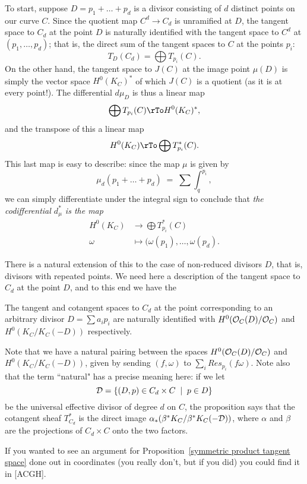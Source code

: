To start, suppose $D = p_1 + \dots + p_d$ is a divisor consisting of $d$ distinct points on our curve $C$. Since the quotient map $C^d \to C_d$ is unramified at $D$, the tangent space to $C_d$ at the point $D$ is naturally identified with the tangent space to $C^d$ at $(p_1,\dots,p_d)$; that is, the direct sum of the tangent spaces to $C$ at the points $p_i$:
$$
T_D(C_d) = \bigoplus T_{p_i}(C).
$$
On the other hand, the tangent space to $J(C)$ at the image point $\mu(D)$ is simply the vector space $H^0(K_C)^*$ of which $J(C)$ is a quotient (as it is at every point!). The differential $d\mu_D$ is thus a linear map
$$
\bigoplus T_{p_i}(C) \rTo H^0(K_C)^*,
$$
and the transpose of this a linear map
$$
H^0(K_C) \rTo \bigoplus T^*_{p_i}(C).
$$
This last map is easy to describe: since the map $\mu$ is given by 
$$
\mu_d(p_1 + \dots + p_d) \; = \; \sum \int_q^{p_i},
$$
we can simply differentiate under the integral sign to conclude that \emph{the codifferential $d_\mu^*$ is the map}
\begin{align*}
H^0(K_C) &\to \bigoplus T^*_{p_i}(C) \\
\omega &\mapsto (\omega(p_1), \dots, \omega(p_d).
\end{align*}

There is a natural extension of this to the case of non-reduced divisors $D$, that is, divisors with repeated points. We need here a description of the tangent space to $C_d$ at the point $D$, and to this end we have the

\begin{proposition}\label{symmetric product tangent space}
The tangent and cotangent spaces to $C_d$ at the point corresponding to an arbitrary divisor $D = \sum a_ip_i$ are naturally identified with $H^0(\cO_C(D)/\cO_C)$ and $H^0(K_C/K_C(-D))$ respectively.
\end{proposition}

Note that we have a natural pairing between the spaces $H^0(\cO_C(D)/\cO_C)$ and $H^0(K_C/K_C(-D))$, given by sending $(f, \omega)$ to $\sum_i Res_{p_i}(f\omega)$. Note also that the term ``natural" has a precise meaning here: if we let 
$$
\cD = \{ (D, p) \in C_d \times C \; \mid \; p \in D \}
$$
be the universal effective divisor of degree $d$ on $C$, the proposition says that the cotangent sheaf $T^*_{C_d}$ is the direct image $\alpha_*(\beta^*K_C/\beta^*K_C(-\cD))$, where $\alpha$ and $\beta$ are the projections of $C_d \times C$ onto the two factors.

If you wanted to see an argument for Proposition~\ref{symmetric product tangent space} done out in coordinates (you really don't, but if you did) you could find it in [ACGH].

